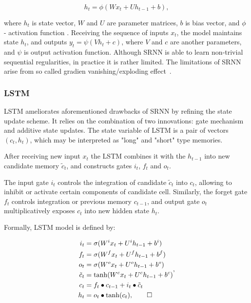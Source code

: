 \documentclass[a4paper,11pt]{article}
\begin{document}
\begin{equation}
\label{eq:SRNN}
h_{t} = \phi(Wx_{t} + Uh_{t-1} + b),
\end{equation}

\noindent where $h_{t}$ is state vector, $W$ and $U$ are parameter matrices, $b$ is bias vector, and $\phi$ - activation function \cite{Elman}. 
Receiving the sequence of inputs $x_{t}$, the model maintains  state $h_{t}$, and 
outputs $y_{t} = \psi(Vh_{t} + c)$, where $V$ and $c$ are another parameters, and $\psi$ is output activation function. Although SRNN is able to learn non-trivial sequential regularities, in practice it is rather limited. The limitations of SRNN arise from so called gradien vanishing/exploding effect~\cite{Bengio}.



\subsubsection{LSTM}


LSTM \cite{Hochreiter} ameliorates aforementioned drawbacks of SRNN by refining the state update scheme. It relies on the combination of two innovations: gate mechanism and additive state updates. The state  variable of LSTM is a pair of vectors $(c_{t}, h_{t})$, which may be interpreted as "long" and "short" type memories. 


After receiving new input $x_{t}$ the LSTM combines it with the $h_{t-1}$ into new candidate memory $
\tilde{c}_{t}$, and constructs gates $i_{t}$, $f_{t}$ and $o_{t}$. 

The input gate $i_{t}$ controls the integration of candidate $\tilde{c}_{t}$ into $c_{t}$, allowing to 
inhibit or activate certain components of candidate cell. Similarly, the forget gate $f_{t}$ controls integration or previous memory $c_{t-1}$, 
and output gate $o_{t}$ multiplicatively exposes $c_{t}$ into new hidden state $h_{t}$.

Formally, LSTM model is defined by:

\begin{align}
\begin{split}
\label{LSTM}
i_{t} &=\sigma(W^{i}x_{t} + U^{i}h_{t-1} + b^{i})\\
f_{t} &=\sigma(W^{f}x_{t} + U^{f}h_{t-1} + b^{f})\\
o_{t} &=\sigma(W^{o}x_{t} + U^{o}h_{t-1} + b^{o})\\
\tilde{c}_{t} &= \tanh(W^{c}x_{t} + U^{c}h_{t-1} + b^{c})\\
c_{t} &=f_{t} \bullet c_{t-1} + i_{t} \bullet \tilde{c}_{t}\\
h_{t} &=o_{t} \bullet \tanh(c_{t}), \qedhere
\end{split},
\end{align}
\end{document}
